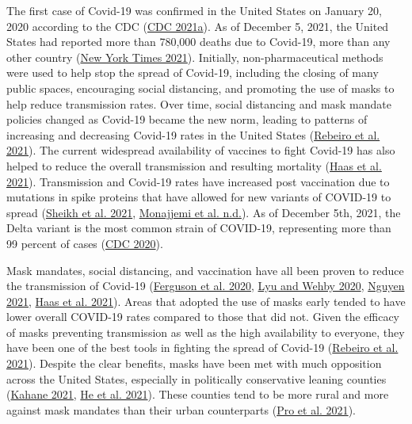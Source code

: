 \documentclass[
  12pt,
]{article}
\begin{document}
The first case of Covid-19 was confirmed in the United States on January 20, 2020 according to the CDC (\protect\hyperlink{ref-cdc_cdc_2021}{CDC 2021a}). As of December 5, 2021, the United States had reported more than 780,000 deaths due to Covid-19, more than any other country (\protect\hyperlink{ref-new_york_times_coronavirus_2021}{New York Times 2021}). Initially, non-pharmaceutical methods were used to help stop the spread of Covid-19, including the closing of many public spaces, encouraging social distancing, and promoting the use of masks to help reduce transmission rates. Over time, social distancing and mask mandate policies changed as Covid-19 became the new norm, leading to patterns of increasing and decreasing Covid-19 rates in the United States (\protect\hyperlink{ref-rebeiro_impact_2021}{Rebeiro et al. 2021}). The current widespread availability of vaccines to fight Covid-19 has also helped to reduce the overall transmission and resulting mortality (\protect\hyperlink{ref-haas_infections_2021}{Haas et al. 2021}). Transmission and Covid-19 rates have increased post vaccination due to mutations in spike proteins that have allowed for new variants of COVID-19 to spread (\protect\hyperlink{ref-sheikh_sars-cov-2_2021}{Sheikh et al. 2021}, \protect\hyperlink{ref-monajjemi_delta_nodate}{Monajjemi et al. n.d.}). As of December 5th, 2021, the Delta variant is the most common strain of COVID-19, representing more than 99 percent of cases (\protect\hyperlink{ref-cdc_covid_2020}{CDC 2020}).

Mask mandates, social distancing, and vaccination have all been proven to reduce the transmission of Covid-19 (\protect\hyperlink{ref-ferguson_report_2020}{Ferguson et al. 2020}, \protect\hyperlink{ref-lyu_community_2020}{Lyu and Wehby 2020}, \protect\hyperlink{ref-nguyen_mask_2021}{Nguyen 2021}, \protect\hyperlink{ref-haas_infections_2021}{Haas et al. 2021}). Areas that adopted the use of masks early tended to have lower overall COVID-19 rates compared to those that did not. Given the efficacy of masks preventing transmission as well as the high availability to everyone, they have been one of the best tools in fighting the spread of Covid-19 (\protect\hyperlink{ref-rebeiro_impact_2021}{Rebeiro et al. 2021}). Despite the clear benefits, masks have been met with much opposition across the United States, especially in politically conservative leaning counties (\protect\hyperlink{ref-kahane_politicizing_2021}{Kahane 2021}, \protect\hyperlink{ref-he_why_2021}{He et al. 2021}). These counties tend to be more rural and more against mask mandates than their urban counterparts (\protect\hyperlink{ref-pro_us_2021}{Pro et al. 2021}).
\end{document}
